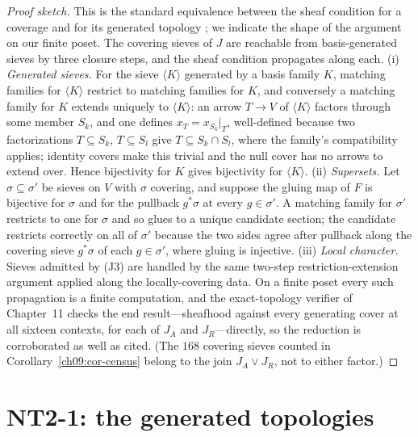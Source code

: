 \begin{proof}[Proof sketch]
This is the standard equivalence between the sheaf condition for a coverage and for its generated topology \cite{stacks00ZC, johnstone}; we indicate the shape of the argument on our finite poset. The covering sieves of $J$ are reachable from basis-generated sieves by three closure steps, and the sheaf condition propagates along each. (i) \emph{Generated sieves.} For the sieve $\langle K\rangle$ generated by a basis family $K$, matching families for $\langle K\rangle$ restrict to matching families for $K$, and conversely a matching family for $K$ extends uniquely to $\langle K\rangle$: an arrow $T\to V$ of $\langle K\rangle$ factors through some member $S_{k}$, and one defines $x_{T}=x_{S_{k}}|_{T}$, well-defined because two factorizations $T\subseteq S_{k}$, $T\subseteq S_{l}$ give $T\subseteq S_{k}\cap S_{l}$, where the family's compatibility applies; identity covers make this trivial and the null cover has no arrows to extend over. Hence bijectivity for $K$ gives bijectivity for $\langle K\rangle$. (ii) \emph{Supersets.} Let $\sigma\subseteq\sigma'$ be sieves on $V$ with $\sigma$ covering, and suppose the gluing map of $F$ is bijective for $\sigma$ and for the pullback $g^{*}\sigma$ at every $g\in\sigma'$. A matching family for $\sigma'$ restricts to one for $\sigma$ and so glues to a unique candidate section; the candidate restricts correctly on all of $\sigma'$ because the two sides agree after pullback along the covering sieve $g^{*}\sigma$ of each $g\in\sigma'$, where gluing is injective. (iii) \emph{Local character.} Sieves admitted by (J3) are handled by the same two-step restriction-extension argument applied along the locally-covering data. On a finite poset every such propagation is a finite computation, and the exact-topology verifier of Chapter~11 checks the end result---sheafhood against every generating cover at all sixteen contexts, for each of $J_{A}$ and $J_{R}$---directly, so the reduction is corroborated as well as cited. (The $168$ covering sieves counted in Corollary~\ref{ch09:cor-census} belong to the join $J_{A}\vee J_{R}$, not to either factor.)
\end{proof}

\section{NT2-1: the generated topologies}\label{ch09:sec-nt21}


